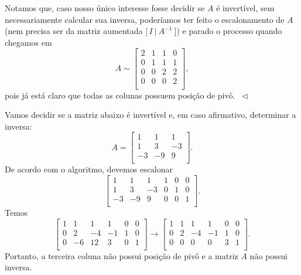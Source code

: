 \documentclass[../livro.tex]{subfiles}  %
\begin{document}
\begin{example}
	Notamos que, caso nosso único interesse fosse decidir se $A$ é invertível, sem necessariamente calcular sua inversa, poderíamos ter feito o escalonamento de $A$ (nem precisa ser da matriz aumentada $\big[ \, I \ | \ A^{-1} \ \big]$) e parado o processo quando chegamos em
	\begin{equation}
	A \sim \left[
	\begin{array}{cccc}
	2 & 1 & 1 & 0 \\
	0 & 1 & 1 & 1 \\
	0 & 0 & 2 & 2 \\
	0 & 0 & 0 & 2 \\
	\end{array}
	\right],
	\end{equation} pois já está claro que todas as colunas possuem posição de pivô. $\ \lhd$
\end{example}



\begin{example}
	Vamos decidir se a matriz abaixo é invertível e, em caso afirmativo, determinar a inversa:
	\begin{equation}
	A =
	\left[
	\begin{array}{cccc}
	1 & 1 & 1  \\
	1 & 3 & -3  \\
	-3 & -9 & 9  \\
	\end{array}
	\right].
	\end{equation} De acordo com o algoritmo, devemos escalonar
	\begin{equation}
	\left[
	\begin{array}{ccc|ccc}
	1 & 1 & 1 & 1 & 0 & 0  \\
	1 & 3 & -3 & 0 & 1 & 0  \\
	-3 & -9 & 9  & 0 & 0 & 1 \\
	\end{array}
	\right].
	\end{equation} Temos
	\begin{equation}
	\left[
	\begin{array}{ccc|ccc}
	1 & 1 & 1 & 1 & 0 & 0  \\
	0 & 2 & -4 & -1 & 1 & 0  \\
	0 & -6 & 12  & 3 & 0 & 1 \\
	\end{array}
	\right] \to
	\left[
	\begin{array}{ccc|ccc}
	1 & 1 & 1 & 1 & 0 & 0  \\
	0 & 2 & -4 & -1 & 1 & 0  \\
	0 & 0 & 0  & 0 & 3 & 1 \\
	\end{array}
	\right].
	\end{equation} Portanto, a terceira coluna não possui posição de pivô e a matriz $A$ não possui inversa.
\end{example}
\end{document}
